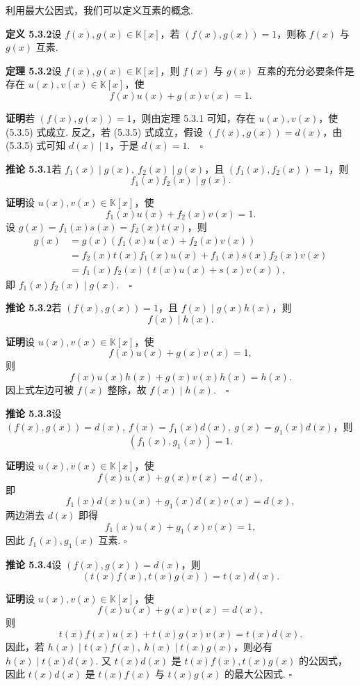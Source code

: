 \documentclass[UTF8, 12pt, fontset=fandol, oneside]{ctexart}
\begin{document}
利用最大公因式，我们可以定义互素的概念.

\noindent\textbf{定义 5.3.2}\quad 设 $f(x),g(x)\in\mathbb{K}[x]$，若 $(f(x),g(x))=1$，则称 $f(x)$ 与 $g(x)$ 互素.

\noindent\textbf{定理 5.3.2}\quad 设 $f(x),g(x)\in\mathbb{K}[x]$，则 $f(x)$ 与 $g(x)$ 互素的充分必要条件是存在 $u(x),v(x)\in\mathbb{K}[x]$，使
\begin{equation}
f(x)u(x)+g(x)v(x)=1.
\tag{5.3.5}
\end{equation}

\noindent\textbf{证明}\quad 若 $(f(x),g(x))=1$，则由定理 5.3.1 可知，存在 $u(x),v(x)$，使 (5.3.5) 式成立. 反之，若 (5.3.5) 式成立，假设 $(f(x),g(x))=d(x)$，由 (5.3.5) 式可知 $d(x)\mid 1$，于是 $d(x)=1.\quad \square$

\noindent\textbf{推论 5.3.1}\quad 若 $f_1(x)\mid g(x),\ f_2(x)\mid g(x)$，且 $(f_1(x),f_2(x))=1$，则
\[
f_1(x)f_2(x)\mid g(x).
\]

\noindent\textbf{证明}\quad 设 $u(x),v(x)\in\mathbb{K}[x]$，使
\[
f_1(x)u(x)+f_2(x)v(x)=1.
\]
设 $g(x)=f_1(x)s(x)=f_2(x)t(x)$，则
\[
\begin{aligned}
g(x)&=g(x)(f_1(x)u(x)+f_2(x)v(x))\\
&=f_2(x)t(x)f_1(x)u(x)+f_1(x)s(x)f_2(x)v(x)\\
&=f_1(x)f_2(x)(t(x)u(x)+s(x)v(x)),
\end{aligned}
\]
即 $f_1(x)f_2(x)\mid g(x).\quad \square$

\noindent\textbf{推论 5.3.2}\quad 若 $(f(x),g(x))=1$，且 $f(x)\mid g(x)h(x)$，则
\[
f(x)\mid h(x).
\]

\noindent\textbf{证明}\quad 设 $u(x),v(x)\in\mathbb{K}[x]$，使
\[
f(x)u(x)+g(x)v(x)=1,
\]
则
\[
f(x)u(x)h(x)+g(x)v(x)h(x)=h(x).
\]
因上式左边可被 $f(x)$ 整除，故 $f(x)\mid h(x).\quad \square$

\noindent\textbf{推论 5.3.3}\quad 设 $(f(x),g(x))=d(x),\ f(x)=f_1(x)d(x),\ g(x)=g_1(x)d(x)$，则
\[
(f_1(x),g_1(x))=1.
\]

\noindent\textbf{证明}\quad 设 $u(x),v(x)\in\mathbb{K}[x]$，使
\[
f(x)u(x)+g(x)v(x)=d(x),
\]
即
\[
f_1(x)d(x)u(x)+g_1(x)d(x)v(x)=d(x),
\]
两边消去 $d(x)$ 即得
\[
f_1(x)u(x)+g_1(x)v(x)=1,
\]
因此 $f_1(x),g_1(x)$ 互素. $\square$

\noindent\textbf{推论 5.3.4}\quad 设 $(f(x),g(x))=d(x)$，则
\[
(t(x)f(x),t(x)g(x))=t(x)d(x).
\]

\noindent\textbf{证明}\quad 设 $u(x),v(x)\in\mathbb{K}[x]$，使
\[
f(x)u(x)+g(x)v(x)=d(x),
\]
则
\[
t(x)f(x)u(x)+t(x)g(x)v(x)=t(x)d(x).
\]
因此，若 $h(x)\mid t(x)f(x),\ h(x)\mid t(x)g(x)$，则必有 $h(x)\mid t(x)d(x)$. 又 $t(x)d(x)$ 是 $t(x)f(x),t(x)g(x)$ 的公因式，因此 $t(x)d(x)$ 是 $t(x)f(x)$ 与 $t(x)g(x)$ 的最大公因式. $\square$
\end{document}
